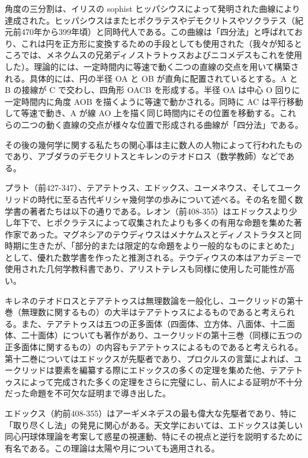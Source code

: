 \documentclass[a4paper,11pt,openany]{ltjsbook}
\begin{document}
角度の三分割は、イリスの sophist ヒッパシウスによって発明された曲線により達成された。ヒッパシウスはまたヒポクラテスやデモクリトスやソクラテス（紀元前470年から399年頃）と同時代人である。この曲線は「四分法」と呼ばれており、これは円を正方形に変換するための手段としても使用された（我々が知るところでは、メネクムスの兄弟ディノストラトゥスおよびニコメデスもこれを使用した）。理論的には、一定時間内に等速で動く二つの直線の交点を用いて構築される。具体的には、円の半径 OA と OB が直角に配置されているとする。A と B の接線が C で交わし、四角形 OACB を形成する。半径 OA は中心 O 回りに一定時間内に角度 AOB を描くように等速で動かされる。同時に AC は平行移動して等速で動き、A が線 AO 上を描く同じ時間内にその位置を移動する。これらの二つの動く直線の交点が様々な位置で形成される曲線が「四分法」である。

その後の幾何学に関する私たちの関心事は主に数人の人物によって行われたものであり、アブダラのデモクリトスとキレンのテオドロス（数学教師）などである。

プラト（前427-347）、テアテトゥス、エドックス、ユーメネウス、そしてユークリッドの時代に至る古代ギリシャ幾何学の歩みについて述べる。その名を聞く数学書の著者たちは以下の通りである。レオン（前408-355）はエドックスより少し年下で、ヒポクラテスによって収集されたよりも多くの有用な命題を集めた著作家であった。マグネシアのテウディウスはメナケムスとディノストラタスと同時期に生きたが、「部分的または限定的な命題をより一般的なものにまとめた」として、優れた数学書を作ったと推測される。テウディウスの本はアカデミーで使用された几何学教科書であり、アリストテレスも同様に使用した可能性が高い。

キレネのテオドロスとテアテトゥスは無理数論を一般化し、ユークリッドの第十巻（無理数に関するもの）の大半はテアテトゥスによるものであると考えられる。また、テアテトゥスは五つの正多面体（四面体、立方体、八面体、十二面体、二十面体）についても著作があり、ユークリッドの第十三巻（同様に五つの正多面体に関するもの）の内容もテアテトゥスによるものであると考えられる。第十二巻についてはエドックスが先駆者であり、プロクルスの言葉によれば、ユークリッドは要素を編纂する際にエドックスの多くの定理を集めた他、テアテトゥスによって完成された多くの定理をさらに完璧にし、前人による証明が不十分だった命題を不可欠な証明まで導き出した。

エドックス（約前408-355）はアーギメネデスの最も偉大な先駆者であり、特に「取り尽くし法」の発見に関心がある。天文学においては、エドックスは美しい同心円球体理論を考案して惑星の視運動、特にその視点と逆行を説明するために有名である。この理論は太陽や月についても適用される。
\end{document}
